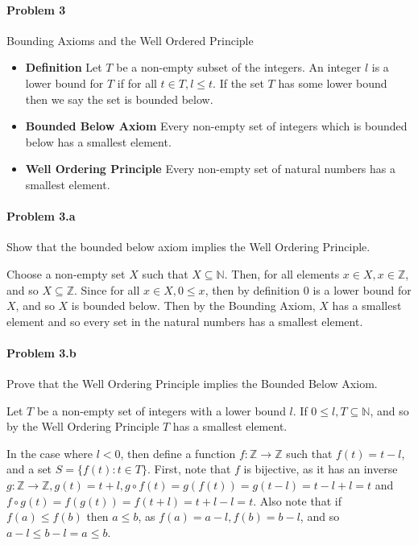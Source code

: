 \documentclass[12pt, letterpaper]{article}
\begin{document}
\paragraph{Problem 3} Bounding Axioms and the Well Ordered Principle

\begin{itemize}
\item \textbf{Definition} Let \(T\) be a non-empty subset of the integers. An integer \(l\) is a lower bound for \(T\) if for all \(t \in T, l \leq t\). If the set  \(T\)  has some lower bound then we say the set is bounded below.
\item \textbf{Bounded Below Axiom} Every non-empty set of integers which is bounded below has a smallest element.
\item \textbf{Well Ordering Principle} Every non-empty set of natural numbers has a smallest element.
\end{itemize}

\paragraph {Problem 3.a} Show that the bounded below axiom implies the Well Ordering Principle.

Choose a non-empty set \(X\) such that \(X \subseteq \mathbb{N}\). Then, for all elements \( x \in X, x \in \mathbb{Z} \), and so \(X \subseteq \mathbb{Z}\). Since for all \(x \in X, 0 \leq x\), then by definition 0 is a lower bound for \(X\), and so \(X\) is bounded below. Then by the Bounding Axiom, \(X\) has a smallest element and so every set in the natural numbers has a smallest element.

\paragraph {Problem 3.b} Prove that the Well Ordering Principle implies the Bounded Below Axiom.

Let \(T\) be a non-empty set of integers with a lower bound \(l\). If \( 0 \leq l, T \subseteq \mathbb{N}\), and so by the Well Ordering Principle \(T\) has a smallest element.

 In the case where \(l < 0\), then define a function \(f:\mathbb{Z} \rightarrow \mathbb{Z}\) such that \(f(t) = t - l\), and a set \(S = \{f(t) : t \in T \}\). 
 First, note that \(f\) is bijective, as it has an inverse \(g:\mathbb{Z} \rightarrow \mathbb{Z}, g(t) = t + l, g\circ f (t) = g(f(t)) = g(t - l) = t - l + l = t\) and \(f\circ g(t) = f(g(t)) = f(t + l) = t + l - l = t\). Also note that if \(f(a) \leq f(b)\) then \(a \leq b\), as \(f(a) = a - l, f(b) = b - l\), and so \(a - l \leq b - l = a \leq b\).
 
\end{document}
